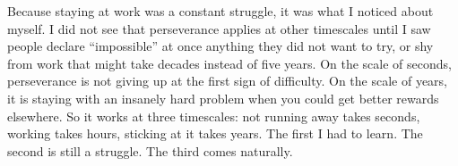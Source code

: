 Because staying at work was a constant struggle, it was what I noticed about myself. I did not see that perseverance applies at other timescales until I saw people declare ``impossible'' at once anything they did not want to try, or shy from work that might take decades instead of five years. On the scale of seconds, perseverance is not giving up at the first sign of difficulty. On the scale of years, it is staying with an insanely hard problem when you could get better rewards elsewhere. So it works at three timescales: not running away takes seconds, working takes hours, sticking at it takes years. The first I had to learn. The second is still a struggle. The third comes naturally.
